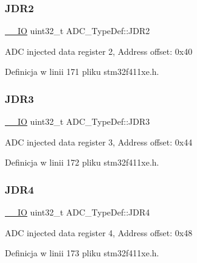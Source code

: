 \subsubsection{\texorpdfstring{J\+D\+R2}{JDR2}}
{\footnotesize\ttfamily \hyperlink{core__sc300_8h_aec43007d9998a0a0e01faede4133d6be}{\+\_\+\+\_\+\+IO} uint32\+\_\+t A\+D\+C\+\_\+\+Type\+Def\+::\+J\+D\+R2}

A\+DC injected data register 2, Address offset\+: 0x40 

Definicja w linii 171 pliku stm32f411xe.\+h.

\mbox{\label{struct_a_d_c___type_def_a40999cd0a255ef62b2340e2726695063}} 
\subsubsection{\texorpdfstring{J\+D\+R3}{JDR3}}
{\footnotesize\ttfamily \hyperlink{core__sc300_8h_aec43007d9998a0a0e01faede4133d6be}{\+\_\+\+\_\+\+IO} uint32\+\_\+t A\+D\+C\+\_\+\+Type\+Def\+::\+J\+D\+R3}

A\+DC injected data register 3, Address offset\+: 0x44 

Definicja w linii 172 pliku stm32f411xe.\+h.

\mbox{\label{struct_a_d_c___type_def_abae6e9d688b16ef350878998f5e21c0b}} 
\subsubsection{\texorpdfstring{J\+D\+R4}{JDR4}}
{\footnotesize\ttfamily \hyperlink{core__sc300_8h_aec43007d9998a0a0e01faede4133d6be}{\+\_\+\+\_\+\+IO} uint32\+\_\+t A\+D\+C\+\_\+\+Type\+Def\+::\+J\+D\+R4}

A\+DC injected data register 4, Address offset\+: 0x48 

Definicja w linii 173 pliku stm32f411xe.\+h.

\mbox{\label{struct_a_d_c___type_def_aa005e656f528aaad28d70d61c9db9b81}} 
